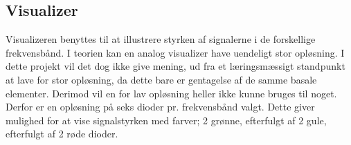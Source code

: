 
\subsection{Visualizer}
\label{visualizer}
Visualizeren benyttes til at illustrere styrken af signalerne i de forskellige frekvensbånd. I teorien kan en analog visualizer have uendeligt stor opløsning. I dette projekt vil det dog ikke give mening, ud fra et læringsmæssigt standpunkt at lave for stor opløsning, da dette bare er gentagelse af de samme basale elementer. Derimod vil en for lav opløsning heller ikke kunne bruges til noget. Derfor er en opløsning på seks dioder pr. frekvensbånd valgt. Dette giver mulighed for at vise signalstyrken med farver; 2 grønne, efterfulgt af 2 gule, efterfulgt af 2 røde dioder.
